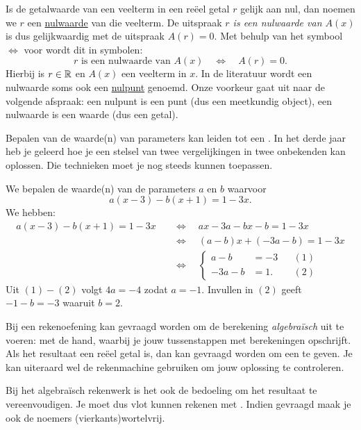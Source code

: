 \documentclass{ximera}
\begin{document}
Is de getalwaarde van een veelterm in een re\"eel getal $r$ gelijk aan nul, dan noemen we $r$ een \underline{nulwaarde}  van die veelterm. De uitspraak {\em $r$ is een nulwaarde van $A(x)$} is dus gelijkwaardig met de uitspraak {\em $A(r) = 0$}. Met behulp van het symbool $\Leftrightarrow$ voor  wordt dit in symbolen:
\[
r \text{ is een nulwaarde van } A(x) \quad \Leftrightarrow \quad A(r) = 0.
\]
Hierbij is $r \in \mathbb{R}$ en $A(x)$ een veelterm in $x$. In de literatuur wordt een nulwaarde soms ook een \underline{nulpunt} genoemd. Onze voorkeur gaat uit naar de volgende afspraak: een nulpunt is een punt (dus een meetkundig object), een nulwaarde is een waarde (dus een getal).

Bepalen van de waarde(n) van parameters kan leiden tot een . 
In het derde jaar heb je geleerd hoe je een stelsel van twee vergelijkingen in twee onbekenden kan oplossen. Die technieken moet je nog steeds kunnen toepassen. 

\begin{voorbeeld}
We bepalen de waarde(n) van de parameters $a$ en $b$ waarvoor
\[
a(x-3) - b(x+1) = 1-3x.
\]
We hebben:
\begin{align*}
a(x-3) - b(x+1) = 1-3x \quad 
& \Leftrightarrow \quad ax-3a-bx-b=1-3x \\
& \Leftrightarrow \quad (a-b)x +(-3a-b) = 1-3x \\
& \Leftrightarrow \quad
\left\{
\begin{aligned}
a - b & = -3 && (1)\\
-3a - b & = 1. && (2)
\end{aligned}
\right.
\end{align*}
Uit $(1)-(2)$ volgt $4a = -4$ zodat $a = -1$. Invullen in $(2)$ geeft $-1-b =  -3$ waaruit $b = 2$. 
\end{voorbeeld}

Bij een rekenoefening kan gevraagd worden om de berekening {\em algebra\"isch} uit te voeren: met de hand, waarbij je jouw tussenstappen met berekeningen opschrijft. Als het resultaat een re\"eel getal is, dan kan gevraagd worden om een  te geven. Je kan uiteraard wel de rekenmachine gebruiken om jouw oplossing te controleren. 

Bij het algebra\"isch rekenwerk is het ook de bedoeling om het resultaat te vereenvoudigen. Je moet dus vlot kunnen rekenen met . 
Indien gevraagd maak je ook de noemers (vierkants)wortelvrij. 
\end{document}
